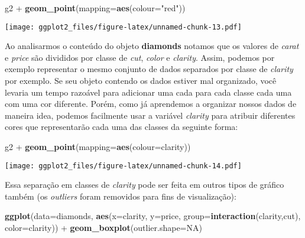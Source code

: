 \documentclass[]{article}
\newenvironment{Shaded}{\begin{snugshade}}{\end{snugshade}}
\newcommand{\KeywordTok}[1]{\textcolor[rgb]{0.13,0.29,0.53}{\textbf{{#1}}}}
\newcommand{\DataTypeTok}[1]{\textcolor[rgb]{0.13,0.29,0.53}{{#1}}}
\newcommand{\StringTok}[1]{\textcolor[rgb]{0.31,0.60,0.02}{{#1}}}
\newcommand{\OtherTok}[1]{\textcolor[rgb]{0.56,0.35,0.01}{{#1}}}
\newcommand{\NormalTok}[1]{{#1}}
\begin{document}
\begin{Shaded}
\begin{Highlighting}[]
\NormalTok{g2 +}\StringTok{ }\KeywordTok{geom_point}\NormalTok{(}\DataTypeTok{mapping=}\KeywordTok{aes}\NormalTok{(}\DataTypeTok{colour=}\StringTok{"red"}\NormalTok{))}
\end{Highlighting}
\end{Shaded}

\texttt{[image: ggplot2\_files/figure-latex/unnamed-chunk-13.pdf]}

Ao analisarmos o conteúdo do objeto \textbf{diamonds} notamos que os
valores de \emph{carat} e \emph{price} são divididos por classe de
\emph{cut}, \emph{color} e \emph{clarity}. Assim, podemos por exemplo
representar o mesmo conjunto de dados separados por classe de
\emph{clarity} por exemplo. Se seu objeto contendo os dados estiver mal
organizado, você levaria um tempo razoável para adicionar uma cada para
cada classe cada uma com uma cor diferente. Porém, como já aprendemos a
organizar nossos dados de maneira idea, podemos facilmente usar a
variável \emph{clarity} para atribuir diferentes cores que representarão
cada uma das classes da seguinte forma:

\begin{Shaded}
\begin{Highlighting}[]
\NormalTok{g2 +}\StringTok{ }\KeywordTok{geom_point}\NormalTok{(}\DataTypeTok{mapping=}\KeywordTok{aes}\NormalTok{(}\DataTypeTok{colour=}\NormalTok{clarity))}
\end{Highlighting}
\end{Shaded}

\texttt{[image: ggplot2\_files/figure-latex/unnamed-chunk-14.pdf]}

Essa separação em classes de \emph{clarity} pode ser feita em outros
tipos de gráfico também (os \emph{outliers} foram removidos para fins de
visualização):

\begin{Shaded}
\begin{Highlighting}[]
\KeywordTok{ggplot}\NormalTok{(}\DataTypeTok{data=}\NormalTok{diamonds,}
       \KeywordTok{aes}\NormalTok{(}\DataTypeTok{x=}\NormalTok{clarity, }\DataTypeTok{y=}\NormalTok{price, }\DataTypeTok{group=}\KeywordTok{interaction}\NormalTok{(clarity,cut), }\DataTypeTok{color=}\NormalTok{clarity)) +}
\StringTok{           }\KeywordTok{geom_boxplot}\NormalTok{(}\DataTypeTok{outlier.shape=}\OtherTok{NA}\NormalTok{)}
\end{Highlighting}
\end{Shaded}
\end{document}
